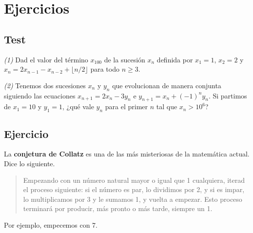 \documentclass[
]{book}
\theoremstyle{definition}
\theoremstyle{definition}
\theoremstyle{definition}
\theoremstyle{remark}
\begin{document}
\hypertarget{ejercicios-6}{%
\section{Ejercicios}\label{ejercicios-6}}

\hypertarget{test-5}{%
\subsection*{Test}\label{test-5}}

\emph{(1)} Dad el valor del término \(x_{100}\) de la sucesión \(x_n\) definida por \(x_1=1\), \(x_2=2\) y \(x_{n}=2x_{n-1}-x_{n-2}+\lfloor n/2\rfloor\) para todo \(n\geqslant 3\).

\emph{(2)} Tenemos dos sucesiones \(x_n\) y \(y_n\) que evolucionan de manera conjunta siguiendo las ecuaciones \(x_{n+1}=2x_n-3y_n\) e \(y_{n+1}=x_n+(-1)^ny_n\). Si partimos de \(x_1=10\) y \(y_1=1\), ¿qué vale \(y_n\) para el primer \(n\) tal que \(x_n>10^6\)?

\hypertarget{ejercicio-6}{%
\subsection*{Ejercicio}\label{ejercicio-6}}

La \textbf{conjetura de Collatz} es una de las más misteriosas de la matemática actual. Dice lo siguiente.

\begin{quote}
Empezando con un número natural mayor o igual que 1 cualquiera, iterad el proceso siguiente: si el número es par, lo dividimos por 2, y si es impar, lo multiplicamos por 3 y le sumamos 1, y vuelta a empezar. Esto proceso terminará por producir, más pronto o más tarde, siempre un 1.
\end{quote}

Por ejemplo, empecemos con 7.
\end{document}
